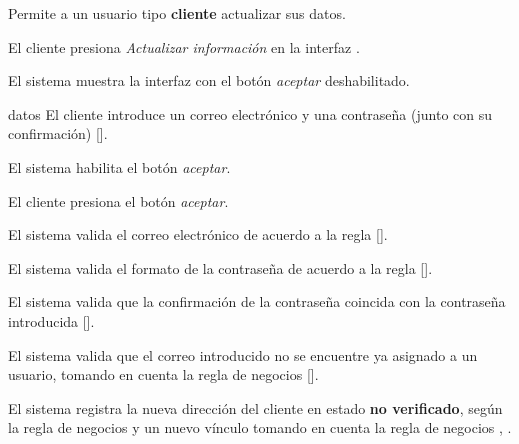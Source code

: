 %
%

{
  Permite a un usuario tipo \textbf{cliente} actualizar sus datos.

  \begin{trayectoriaPrincipal}

    \item El cliente presiona \textit{Actualizar información} en la
      interfaz .

    \item El sistema muestra la interfaz
       con el botón \textit{aceptar}
      deshabilitado.

    \item[datos] El cliente introduce un correo electrónico y una contraseña
      (junto con su confirmación) [].

    \item El sistema habilita el botón \textit{aceptar}.

    \item El cliente presiona el botón \textit{aceptar}.

    \item El sistema valida el correo electrónico de acuerdo a la regla
      [].

    \item El sistema valida el formato de la contraseña de acuerdo a la regla
      [].

    \item El sistema valida que la confirmación de la contraseña coincida con
      la contraseña introducida
      [].

    \item El sistema valida que el correo introducido no se encuentre ya
      asignado a un usuario, tomando en cuenta la regla de negocios
      [].

      \item El sistema registra la nueva dirección del cliente en estado
        \textbf{no verificado}, según la regla de negocios
         y un nuevo vínculo tomando en cuenta
        la regla de negocios
        , .


\end{trayectoriaPrincipal}}
